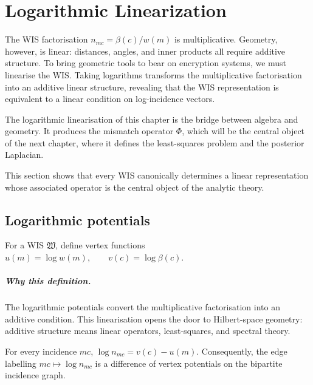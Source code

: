 \chapter[Logarithmic Linearization]{Logarithmic Linearization}\label{ch:sec:graphs}

The WIS factorisation $n_{mc}=\beta(c)/w(m)$ is multiplicative.
Geometry, however, is linear: distances, angles, and inner products all
require additive structure.  To bring geometric tools to bear on
encryption systems, we must linearise the WIS.  Taking logarithms
transforms the multiplicative factorisation into an additive linear
structure, revealing that the WIS representation is equivalent to a
linear condition on log-incidence vectors.

The logarithmic linearisation of this chapter is the bridge between algebra and geometry. It produces the mismatch operator $\Phi$, which will be the central object of the next chapter, where it defines the least-squares problem and the posterior Laplacian.

This section shows that every WIS canonically determines a linear
representation whose associated operator is the central object of the
analytic theory.
\section{Logarithmic potentials}\label{ch:sec:logarithmic-potentials}
\begin{definition}\label{ch:def:log-potentials}
For a WIS $\mathfrak W$, define vertex functions
$u(m)=\log w(m),\qquad v(c)=\log\beta(c).$
\end{definition}

\paragraph{Why this definition.}
The logarithmic potentials convert the multiplicative factorisation into an additive condition.  This linearisation opens the door to Hilbert-space geometry: additive structure means linear operators, least-squares, and spectral theory.

\begin{proposition}\label{ch:prop:potential}
For every incidence $mc$, $\log n_{mc}=v(c)-u(m).$ Consequently, the edge labelling $mc\mapsto\log n_{mc}$ is a difference of vertex potentials on the bipartite incidence graph.
\end{proposition}

